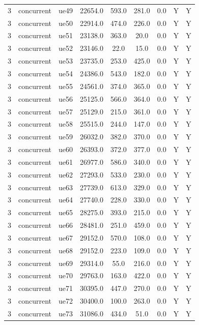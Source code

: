 \begin{table}[ht]
\begin{tabular}{|c|c|c|c|c|c|c|c|c|}
3 & concurrent & ue49 & 22654.0 & 593.0 & 281.0 & 0.0 & Y & Y \\
3 & concurrent & ue50 & 22914.0 & 474.0 & 226.0 & 0.0 & Y & Y \\
3 & concurrent & ue51 & 23138.0 & 363.0 & 20.0 & 0.0 & Y & Y \\
3 & concurrent & ue52 & 23146.0 & 22.0 & 15.0 & 0.0 & Y & Y \\
3 & concurrent & ue53 & 23735.0 & 253.0 & 425.0 & 0.0 & Y & Y \\
3 & concurrent & ue54 & 24386.0 & 543.0 & 182.0 & 0.0 & Y & Y \\
3 & concurrent & ue55 & 24561.0 & 374.0 & 365.0 & 0.0 & Y & Y \\
3 & concurrent & ue56 & 25125.0 & 566.0 & 364.0 & 0.0 & Y & Y \\
3 & concurrent & ue57 & 25129.0 & 215.0 & 361.0 & 0.0 & Y & Y \\
3 & concurrent & ue58 & 25515.0 & 244.0 & 147.0 & 0.0 & Y & Y \\
3 & concurrent & ue59 & 26032.0 & 382.0 & 370.0 & 0.0 & Y & Y \\
3 & concurrent & ue60 & 26393.0 & 372.0 & 377.0 & 0.0 & Y & Y \\
3 & concurrent & ue61 & 26977.0 & 586.0 & 340.0 & 0.0 & Y & Y \\
3 & concurrent & ue62 & 27293.0 & 533.0 & 230.0 & 0.0 & Y & Y \\
3 & concurrent & ue63 & 27739.0 & 613.0 & 329.0 & 0.0 & Y & Y \\
3 & concurrent & ue64 & 27740.0 & 228.0 & 330.0 & 0.0 & Y & Y \\
3 & concurrent & ue65 & 28275.0 & 393.0 & 215.0 & 0.0 & Y & Y \\
3 & concurrent & ue66 & 28481.0 & 251.0 & 459.0 & 0.0 & Y & Y \\
3 & concurrent & ue67 & 29152.0 & 570.0 & 108.0 & 0.0 & Y & Y \\
3 & concurrent & ue68 & 29152.0 & 223.0 & 109.0 & 0.0 & Y & Y \\
3 & concurrent & ue69 & 29314.0 & 55.0 & 216.0 & 0.0 & Y & Y \\
3 & concurrent & ue70 & 29763.0 & 163.0 & 422.0 & 0.0 & Y & Y \\
3 & concurrent & ue71 & 30395.0 & 447.0 & 270.0 & 0.0 & Y & Y \\
3 & concurrent & ue72 & 30400.0 & 100.0 & 263.0 & 0.0 & Y & Y \\
3 & concurrent & ue73 & 31086.0 & 434.0 & 51.0 & 0.0 & Y & Y \\

\end{tabular}
\end{table}
